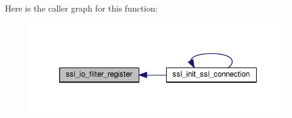 Here is the caller graph for this function\+:
\nopagebreak
\begin{figure}[H]
\begin{center}
\leavevmode
\includegraphics[width=338pt]{group__MOD__SSL__PRIVATE_ga7791817740c9ee192b3487d89278c162_icgraph}
\end{center}
\end{figure}


